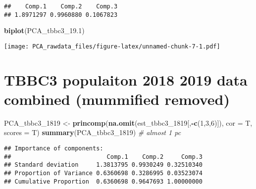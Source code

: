 \documentclass[]{article}
\newenvironment{Shaded}{\begin{snugshade}}{\end{snugshade}}
\newcommand{\CommentTok}[1]{\textcolor[rgb]{0.56,0.35,0.01}{\textit{#1}}}
\newcommand{\DataTypeTok}[1]{\textcolor[rgb]{0.13,0.29,0.53}{#1}}
\newcommand{\DecValTok}[1]{\textcolor[rgb]{0.00,0.00,0.81}{#1}}
\newcommand{\FloatTok}[1]{\textcolor[rgb]{0.00,0.00,0.81}{#1}}
\newcommand{\KeywordTok}[1]{\textcolor[rgb]{0.13,0.29,0.53}{\textbf{#1}}}
\newcommand{\NormalTok}[1]{#1}
\newcommand{\OperatorTok}[1]{\textcolor[rgb]{0.81,0.36,0.00}{\textbf{#1}}}
\newcommand{\StringTok}[1]{\textcolor[rgb]{0.31,0.60,0.02}{#1}}
\begin{document}
\begin{Shaded}
\end{Shaded}

\begin{verbatim}
##    Comp.1    Comp.2    Comp.3 
## 1.8971297 0.9960880 0.1067823
\end{verbatim}

\begin{Shaded}
\begin{Highlighting}[]
\KeywordTok{biplot}\NormalTok{(PCA_tbbc3_}\FloatTok{19.1}\NormalTok{)}
\end{Highlighting}
\end{Shaded}

\texttt{[image: PCA\_rawdata\_files/figure-latex/unnamed-chunk-7-1.pdf]}

\hypertarget{tbbc3-populaiton-2018-2019-data-combined-mummified-removed}{%
\section{TBBC3 populaiton 2018 2019 data combined (mummified
removed)}\label{tbbc3-populaiton-2018-2019-data-combined-mummified-removed}}

\begin{Shaded}
\begin{Highlighting}[]
\NormalTok{PCA_tbbc3_}\DecValTok{1819}\NormalTok{ <-}\StringTok{ }\KeywordTok{princomp}\NormalTok{(}\KeywordTok{na.omit}\NormalTok{(est_tbbc3_}\DecValTok{1819}\NormalTok{[,}\OperatorTok{-}\KeywordTok{c}\NormalTok{(}\DecValTok{1}\NormalTok{,}\DecValTok{3}\NormalTok{,}\DecValTok{6}\NormalTok{)]), }\DataTypeTok{cor =}\NormalTok{ T, }\DataTypeTok{scores =}\NormalTok{ T)}
\KeywordTok{summary}\NormalTok{(PCA_tbbc3_}\DecValTok{1819}\NormalTok{) }\CommentTok{# almost 1 pc}
\end{Highlighting}
\end{Shaded}

\begin{verbatim}
## Importance of components:
##                           Comp.1    Comp.2     Comp.3
## Standard deviation     1.3813795 0.9930249 0.32510340
## Proportion of Variance 0.6360698 0.3286995 0.03523074
## Cumulative Proportion  0.6360698 0.9647693 1.00000000
\end{verbatim}
\end{document}
